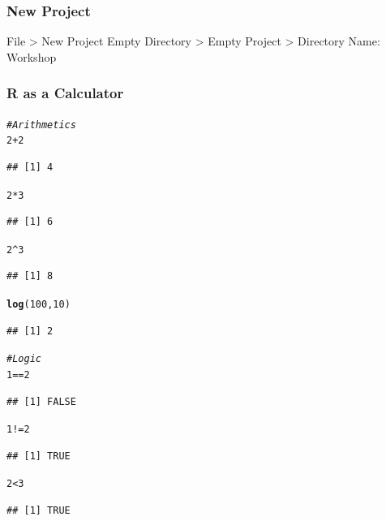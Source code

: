 \documentclass{beamer}\usepackage[]{graphicx}\usepackage[]{color}
\makeatletter
\newcommand{\hlnum}[1]{\textcolor[rgb]{0.686,0.059,0.569}{#1}}%
\newcommand{\hlcom}[1]{\textcolor[rgb]{0.678,0.584,0.686}{\textit{#1}}}%
\newcommand{\hlopt}[1]{\textcolor[rgb]{0,0,0}{#1}}%
\newcommand{\hlstd}[1]{\textcolor[rgb]{0.345,0.345,0.345}{#1}}%
\newcommand{\hlkwd}[1]{\textcolor[rgb]{0.737,0.353,0.396}{\textbf{#1}}}%
\newenvironment{kframe}{%
 \def\at@end@of@kframe{}%
 \ifinner\ifhmode%
  \def\at@end@of@kframe{\end{minipage}}%
  \begin{minipage}{\columnwidth}%
 \fi\fi%
 \def\FrameCommand##1{\hskip\@totalleftmargin \hskip-\fboxsep
 \colorbox{shadecolor}{##1}\hskip-\fboxsep
     \hskip-\linewidth \hskip-\@totalleftmargin \hskip\columnwidth}%
 \MakeFramed {\advance\hsize-\width
   \@totalleftmargin\z@ \linewidth\hsize
   \@setminipage}}%
 {\par\unskip\endMakeFramed%
 \at@end@of@kframe}
\newenvironment{knitrout}{}{} %
\makeatother
\begin{document}
\begin{frame}
\frametitle{New Project}
\vfill
File > New Project
\vfill
Empty Directory > Empty Project > Directory Name: Workshop
\vfill
\end{frame}


\begin{frame}
\frametitle{R as a Calculator}

\begin{knitrout}\scriptsize
{}\color{fgcolor}\begin{kframe}
\begin{alltt}
\hlcom{# Arithmetics}
\hlnum{2} \hlopt{+} \hlnum{2}
\end{alltt}
\begin{verbatim}
## [1] 4
\end{verbatim}
\begin{alltt}
\hlnum{2} \hlopt{*} \hlnum{3}
\end{alltt}
\begin{verbatim}
## [1] 6
\end{verbatim}
\begin{alltt}
\hlnum{2}\hlopt{^}\hlnum{3}
\end{alltt}
\begin{verbatim}
## [1] 8
\end{verbatim}
\begin{alltt}
\hlkwd{log}\hlstd{(}\hlnum{100}\hlstd{,} \hlnum{10}\hlstd{)}
\end{alltt}
\begin{verbatim}
## [1] 2
\end{verbatim}
\end{kframe}
\end{knitrout}

\begin{knitrout}\scriptsize
{}\color{fgcolor}\begin{kframe}
\begin{alltt}
\hlcom{# Logic}
\hlnum{1} \hlopt{==} \hlnum{2}
\end{alltt}
\begin{verbatim}
## [1] FALSE
\end{verbatim}
\begin{alltt}
\hlnum{1} \hlopt{!=} \hlnum{2}
\end{alltt}
\begin{verbatim}
## [1] TRUE
\end{verbatim}
\begin{alltt}
\hlnum{2} \hlopt{<} \hlnum{3}
\end{alltt}
\begin{verbatim}
## [1] TRUE
\end{verbatim}
\end{kframe}
\end{knitrout}

\end{frame}
\end{document}
